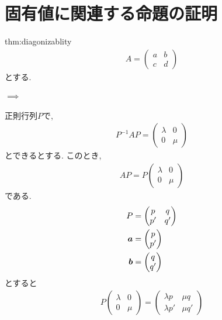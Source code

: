 \section{固有値に関連する命題の証明}
\begin{proofof}{thm:diagonizablity}
  \begin{align*}
    A=
    \begin{pmatrix}
      a &b\\c&d
    \end{pmatrix}
  \end{align*}
  とする.
  \paragraph{$\implies$}
  正則行列$P$で,
  \begin{align*}
    P^{-1}AP=
    \begin{pmatrix}
      \lambda&0\\0&\mu
    \end{pmatrix}
  \end{align*}
  とできるとする.
  このとき,
  \begin{align*}
    AP=
    P\begin{pmatrix}
      \lambda&0\\0&\mu
    \end{pmatrix}
  \end{align*}
  である.
  \begin{align*}
    P&=
    \begin{pmatrix}
      p&q\\p'&q'
    \end{pmatrix}\\
    \boldsymbol{a}&=
    \begin{pmatrix}
      p\\p'
    \end{pmatrix}\\
    \boldsymbol{b}&=
    \begin{pmatrix}
      q\\q'
    \end{pmatrix}
  \end{align*}
  とすると
  \begin{align*}
    P
    \begin{pmatrix}
      \lambda &0\\0&\mu
    \end{pmatrix}=
    \begin{pmatrix}
      \lambda p&\mu q\\ \lambda p'&\mu q'

\end{pmatrix}
\end{align*}
\end{proofof}

